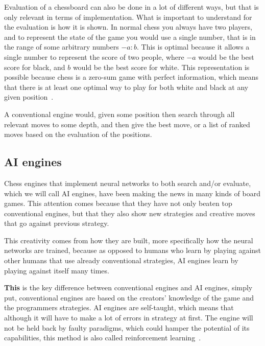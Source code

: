 
Evaluation of a chessboard can also be done in a lot of different ways, but that is only relevant in terms of
implementation.
What is important to understand for the evaluation is how it is shown.
In normal chess you always have two players, and to represent the state of the game you would use a single number,
that is in the range of some arbitrary numbers \( -a : b\).
This is optimal because it allows a single number to represent the score of two people, where \(-a\) would be
the best score for black, and \(b\) would be the best score for white.
This representation is possible because chess is a zero-sum game with perfect information, which means that there is
at least one optimal way to play for both white and black at any given position~\cite{zero-sum-games}.


A conventional engine would, given some position then search through all relevant moves to some depth, and then give
the best move, or a list of ranked moves based on the evaluation of the positions.

\subsection{AI engines}\label{subsec:ai-engines}

Chess engines that implement neural networks to both search and/or evaluate, which we will call AI engines,
have been making the news in many kinds of board games.
This attention comes because that they have not only beaten top conventional engines,
but that they also show new strategies and creative moves that go against previous strategy.

This creativity comes from how they are built, more specifically how the neural networks are trained, because as opposed
to humans who learn by playing against other humans that use already conventional strategies, AI engines learn by
playing against itself many times.

\textbf{This} is the key difference between conventional engines and AI engines, simply put, conventional
engines are based on the creators' knowledge of the game and the programmers strategies.
AI engines are self-taught, which means that although it will have to make a lot of errors in strategy at first.
The engine will not be held back by faulty paradigms, which could hamper the potential of its
capabilities, this method is also called reinforcement learning~\cite{how-neural-network-engines-work}.

